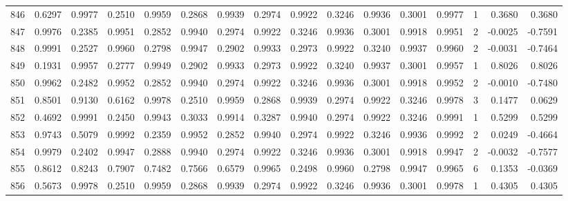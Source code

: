 \begin{tabular}{lrrrrrrrrrrrrrrr}
846 &      0.6297 &  0.9977 &  0.2510 &  0.9959 &  0.2868 &  0.9939 &  0.2974 &  0.9922 &  0.3246 &  0.9936 &   0.3001 &     0.9977 &      1 &                    0.3680 &                     0.3680 \\
847 &      0.9976 &  0.2385 &  0.9951 &  0.2852 &  0.9940 &  0.2974 &  0.9922 &  0.3246 &  0.9936 &  0.3001 &   0.9918 &     0.9951 &      2 &                   -0.0025 &                    -0.7591 \\
848 &      0.9991 &  0.2527 &  0.9960 &  0.2798 &  0.9947 &  0.2902 &  0.9933 &  0.2973 &  0.9922 &  0.3240 &   0.9937 &     0.9960 &      2 &                   -0.0031 &                    -0.7464 \\
849 &      0.1931 &  0.9957 &  0.2777 &  0.9949 &  0.2902 &  0.9933 &  0.2973 &  0.9922 &  0.3240 &  0.9937 &   0.3001 &     0.9957 &      1 &                    0.8026 &                     0.8026 \\
850 &      0.9962 &  0.2482 &  0.9952 &  0.2852 &  0.9940 &  0.2974 &  0.9922 &  0.3246 &  0.9936 &  0.3001 &   0.9918 &     0.9952 &      2 &                   -0.0010 &                    -0.7480 \\
851 &      0.8501 &  0.9130 &  0.6162 &  0.9978 &  0.2510 &  0.9959 &  0.2868 &  0.9939 &  0.2974 &  0.9922 &   0.3246 &     0.9978 &      3 &                    0.1477 &                     0.0629 \\
852 &      0.4692 &  0.9991 &  0.2450 &  0.9943 &  0.3033 &  0.9914 &  0.3287 &  0.9940 &  0.2974 &  0.9922 &   0.3246 &     0.9991 &      1 &                    0.5299 &                     0.5299 \\
853 &      0.9743 &  0.5079 &  0.9992 &  0.2359 &  0.9952 &  0.2852 &  0.9940 &  0.2974 &  0.9922 &  0.3246 &   0.9936 &     0.9992 &      2 &                    0.0249 &                    -0.4664 \\
854 &      0.9979 &  0.2402 &  0.9947 &  0.2888 &  0.9940 &  0.2974 &  0.9922 &  0.3246 &  0.9936 &  0.3001 &   0.9918 &     0.9947 &      2 &                   -0.0032 &                    -0.7577 \\
855 &      0.8612 &  0.8243 &  0.7907 &  0.7482 &  0.7566 &  0.6579 &  0.9965 &  0.2498 &  0.9960 &  0.2798 &   0.9947 &     0.9965 &      6 &                    0.1353 &                    -0.0369 \\
856 &      0.5673 &  0.9978 &  0.2510 &  0.9959 &  0.2868 &  0.9939 &  0.2974 &  0.9922 &  0.3246 &  0.9936 &   0.3001 &     0.9978 &      1 &                    0.4305 &                     0.4305 \\

\end{tabular}
